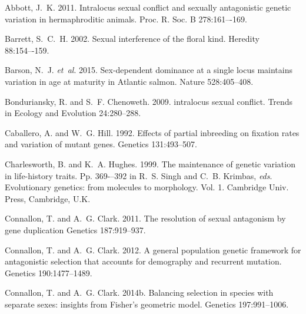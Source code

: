 \documentclass{article}
\begin{document}
\begin{thebibliography}{}

Abbott, J.~K. 2011.
\newblock Intralocus sexual conflict and sexually antagonistic genetic variation in hermaphroditic animals.
\newblock Proc. R. Soc. B 278:161–-169.

Barrett, S.~C.~H. 2002.
\newblock Sexual interference of the floral kind.
\newblock Heredity 88:154–-159.

Barson, N.~J. \textit{et~al}. 2015.
\newblock Sex-dependent dominance at a single locus maintains variation in age at maturity in Atlantic salmon.
\newblock Nature 528:405--408.

Bonduriansky, R. and S.~F. Chenoweth. 2009.
\newblock intralocus sexual conflict.
\newblock Trends in Ecology and Evolution 24:280--288.

Caballero, A. and W.~G. Hill. 1992.
\newblock Effects of partial inbreeding on fixation rates and variation of mutant genes.
\newblock Genetics 131:493--507.

Charlesworth, B. and K.~A. Hughes. 1999.
\newblock The maintenance of genetic variation in life-history traits.
\newblock Pp. 369-–392 in R.~S. Singh and C.~B. Krimbas, \textit{eds}. Evolutionary genetics: from molecules to morphology. Vol. 1. Cambridge Univ. Press, Cambridge, U.K.

Connallon, T. and A.~G. Clark. 2011.
\newblock The resolution of sexual antagonism by gene duplication
\newblock Genetics 187:919--937.

Connallon, T. and A.~G. Clark. 2012.
\newblock A general population genetic framework for antagonistic selection that accounts for demography and recurrent mutation.
\newblock Genetics 190:1477--1489.

Connallon, T. and A.~G. Clark. 2014b.
\newblock Balancing selection in species with separate sexes: insights from Fisher's geometric model.
\newblock Genetics 197:991--1006.


\end{thebibliography}
\end{document}
